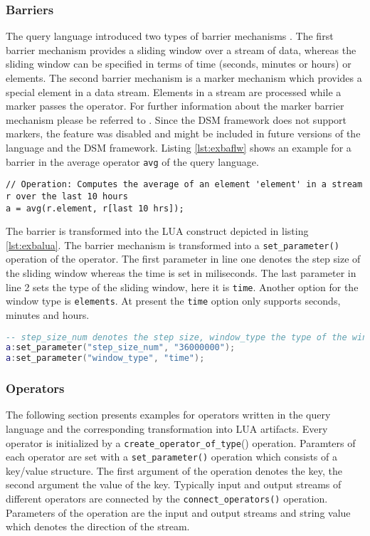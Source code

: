 \subsubsection{Barriers}
The query language introduced two types of barrier mechanisms 
\cite{297:Frey2010}. The first barrier mechanism provides a sliding window over
a stream of data, whereas the sliding window can be specified in terms of time
(seconds, minutes or hours) or elements. The second barrier mechanism is a 
marker mechanism which provides a special element in a data stream. Elements 
in a stream are processed while a marker passes the operator. For further 
information about the marker barrier mechanism please be referred to 
\cite{297:Frey2010}. Since the DSM framework does not support markers, the 
feature was disabled and might be included in future versions of the language 
and the DSM framework. Listing \ref{lst:exbaflw} shows an example for a barrier
in the average operator \texttt{avg} of the query language.
\begin{lstlisting}[language=Flow, caption={\emph{Example of Barrier Mechanism in Flow}},label={lst:exbaflw}]
// Operation: Computes the average of an element 'element' in a stream r over the last 10 hours
a = avg(r.element, r[last 10 hrs]);
\end{lstlisting}
The barrier is transformed into the LUA construct depicted in listing 
\ref{lst:exbalua}. The barrier mechanism is transformed into a 
\texttt{set\_parameter()} operation of the operator. The first parameter in line
one denotes the step size of the sliding window whereas the time is set in 
miliseconds. The last parameter in line 2 sets the type of the sliding window,
here it is \texttt{time}. Another option for the window type is 
\texttt{elements}. At present the \texttt{time} option only supports seconds,
minutes and hours. 
\begin{lstlisting}[language=Lua, caption={\emph{Example of Barrier Mechanism in LUA}},label={lst:exbalua}]
-- step_size_num denotes the step size, window_type the type of the window
a:set_parameter("step_size_num", "36000000");
a:set_parameter("window_type", "time");
\end{lstlisting}

\subsubsection{Operators}
The following section presents examples for operators written in the query 
language and the corresponding  transformation into LUA artifacts. Every 
operator is initialized by a \texttt{create\_operator\_of\_type}() operation. 
Paramters of each operator are set with a \texttt{set\_param\-eter()} operation 
which consists of a key/value structure. The first argument of the operation
denotes the key, the second argument the value of the key. Typically input and
output streams of different operators are connected by the 
\texttt{connect\_operators()} operation. Parameters of the operation are the 
input and output streams and string value which denotes the direction of the 
stream. 


